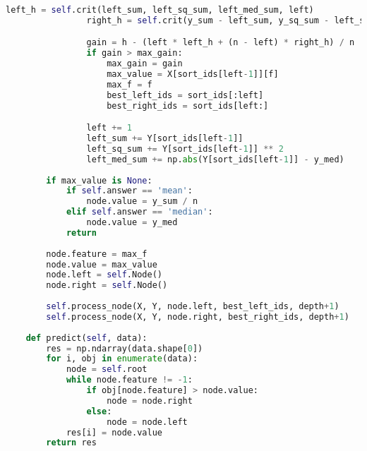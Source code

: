 \begin{lstlisting}[language=python, keepspaces=true]
                left_h = self.crit(left_sum, left_sq_sum, left_med_sum, left)
                right_h = self.crit(y_sum - left_sum, y_sq_sum - left_sq_sum, y_med_sum - left_med_sum, n - left)

                gain = h - (left * left_h + (n - left) * right_h) / n
                if gain > max_gain:
                    max_gain = gain
                    max_value = X[sort_ids[left-1]][f]
                    max_f = f
                    best_left_ids = sort_ids[:left]
                    best_right_ids = sort_ids[left:]

                left += 1
                left_sum += Y[sort_ids[left-1]]
                left_sq_sum += Y[sort_ids[left-1]] ** 2
                left_med_sum += np.abs(Y[sort_ids[left-1]] - y_med)
        
        if max_value is None:
            if self.answer == 'mean':
                node.value = y_sum / n
            elif self.answer == 'median':
                node.value = y_med
            return
        
        node.feature = max_f
        node.value = max_value
        node.left = self.Node()
        node.right = self.Node()
        
        self.process_node(X, Y, node.left, best_left_ids, depth+1)
        self.process_node(X, Y, node.right, best_right_ids, depth+1)
        
    def predict(self, data):
        res = np.ndarray(data.shape[0])
        for i, obj in enumerate(data):
            node = self.root
            while node.feature != -1:
                if obj[node.feature] > node.value:
                    node = node.right
                else:
                    node = node.left
            res[i] = node.value
        return res
\end{lstlisting}

